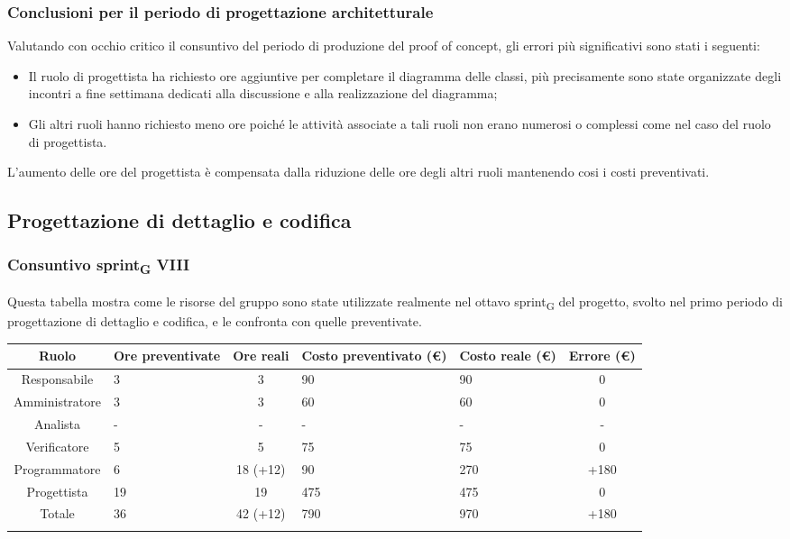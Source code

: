 \subsubsection{Conclusioni per il periodo di progettazione architetturale}

Valutando con occhio critico il consuntivo del periodo di produzione del proof of concept, gli errori
più significativi sono stati i seguenti:
\begin{itemize}
	\item Il ruolo di progettista ha richiesto ore aggiuntive per completare il diagramma delle classi, più precisamente sono state organizzate degli 
	incontri a fine settimana dedicati alla discussione e alla realizzazione del diagramma;
	\item Gli altri ruoli hanno richiesto meno ore poiché le attività associate a tali ruoli non erano numerosi o complessi come nel caso del ruolo di progettista.
\end{itemize}
L'aumento delle ore del progettista è compensata dalla riduzione delle ore degli altri ruoli mantenendo cosi i costi preventivati.


\newpage
\subsection{Progettazione di dettaglio e codifica}
%
\subsubsection{Consuntivo sprint\textsubscript{G} VIII}

Questa tabella mostra come le risorse del gruppo sono state utilizzate realmente nel ottavo sprint\textsubscript{G} del progetto, svolto nel primo periodo di progettazione di dettaglio e codifica, e le confronta con quelle preventivate.

\setlength\extrarowheight{5pt}
\begin{tabularx}{\textwidth}{|c|XcXX|c|}
	\hline
	\rowcolor{white}
	\textbf{Ruolo} & \textbf{Ore preventivate} & \textbf{Ore reali} & \textbf{Costo preventivato (€)} & \textbf{Costo reale (€)} & \textbf{Errore (€)} \\
	\hline
	Responsabile & 3 & 3 & 90 & 90 & 0 \\
	Amministratore & 3 & 3 & 60 & 60 & 0 \\
	Analista & - & - & - & - & - \\
	Verificatore & 5 & 5 & 75 & 75 & 0 \\
	Programmatore & 6 & 18 (+12) & 90 & 270 & +180 \\
	Progettista & 19 & 19 & 475 & 475 & 0 \\
	\hline
	Totale & 36 & 42 (+12) & 790 & 970 & +180 \\
	\hline
	\rowcolor{white}
	\caption{Consuntivo ore e costi per ruolo del ottavo sprint\textsubscript{G}}
\end{tabularx}
